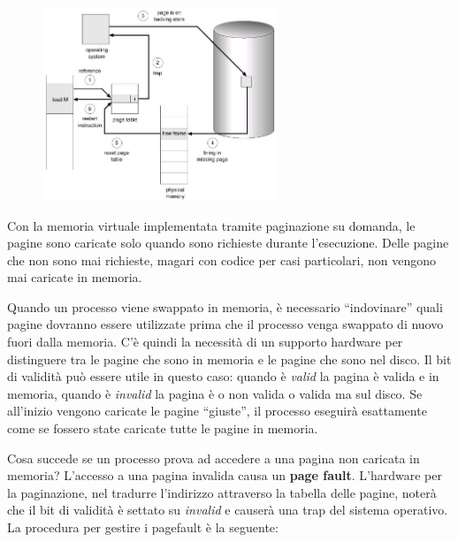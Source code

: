 \documentclass[a4paper]{article}
\begin{document}
\begin{figure}
   \includegraphics[width=7cm]{img/pagefault.JPG}
\end{figure}

Con la memoria virtuale implementata tramite paginazione su domanda, le pagine sono caricate solo quando sono richieste durante l'esecuzione. Delle pagine che non sono mai richieste, magari con codice per casi particolari, non vengono mai caricate in memoria.

Quando un processo viene swappato in memoria, è necessario ``indovinare'' quali pagine dovranno essere utilizzate prima che il processo venga swappato di nuovo fuori dalla memoria. C'è quindi la necessità di un supporto hardware per distinguere tra le pagine che sono in memoria e le pagine che sono nel disco. Il bit di validità può essere utile in questo caso: quando è \textit{valid} la pagina è valida e in memoria, quando è \textit{invalid} la pagina è o non valida o valida ma sul disco. Se all'inizio vengono caricate le pagine ``giuste'', il processo eseguirà esattamente come se fossero state caricate tutte le pagine in memoria.

Cosa succede se un processo prova ad accedere a una pagina non caricata in memoria? L'accesso a una pagina invalida causa un \textbf{page fault}. L'hardware per la paginazione, nel tradurre l'indirizzo attraverso la tabella delle pagine, noterà che il bit di validità è settato su \textit{invalid} e causerà una trap del sistema operativo. La procedura per gestire i pagefault è la seguente:
\end{document}
